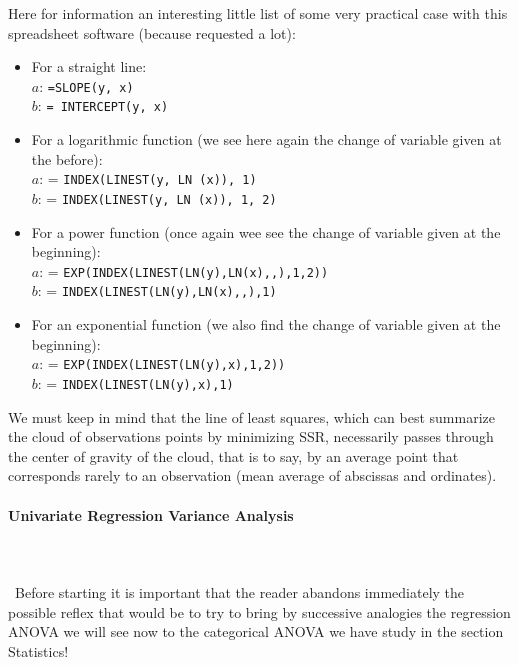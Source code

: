 	Here for information an interesting little list of some very practical case with this spreadsheet software (because requested a lot):
	\begin{itemize}
		\item For a straight line:\\
		
		$a$: \texttt{=SLOPE(y, x)}\\
		$b$: \texttt{= INTERCEPT(y, x)}
		
		\item For a logarithmic function (we see here again the change of variable given at the before):\\
		
		$a$: = \texttt{INDEX(LINEST(y, LN (x)), 1)}\\
		$b$: = \texttt{INDEX(LINEST(y, LN (x)), 1, 2)}
		
		\item For a power function (once again wee see the change of variable given at the beginning):\\
		
		$a$: = \texttt{EXP(INDEX(LINEST(LN(y),LN(x),,),1,2))}\\
		$b$: = \texttt{INDEX(LINEST(LN(y),LN(x),,),1)}
		
		\item For an exponential function (we also find the change of variable given at the beginning):\\
		
		$a$: = \texttt{EXP(INDEX(LINEST(LN(y),x),1,2))}\\
		$b$: = \texttt{INDEX(LINEST(LN(y),x),1)}\\
	\end{itemize}
	
	\begin{tcolorbox}[title=Remark,colframe=black,arc=10pt]
We must keep in mind that the line of least squares, which can best summarize the cloud of observations points by minimizing SSR, necessarily passes through the center of gravity of the cloud, that is to say, by an average point that corresponds rarely to an observation (mean average of abscissas and ordinates).
	\end{tcolorbox}
	
	\pagebreak
	\paragraph{Univariate Regression Variance Analysis}\label{univariate regression variance analysis}\mbox{}\\\\\
	Before starting it is important that the reader abandons immediately the possible reflex that would be to try to bring by successive analogies the regression ANOVA we will see now to the categorical ANOVA we have study in the section Statistics!
	
